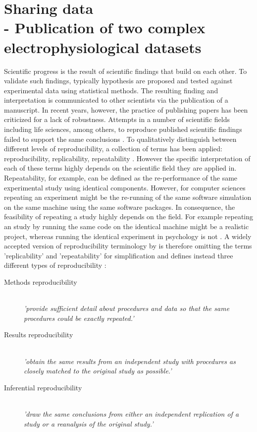 \clearpage
\chapter[Sharing data]{Sharing data\\- Publication of two complex electrophysiological datasets}
\label{sec:data}

Scientific progress is the result of scientific findings that build on each other. To validate such findings, typically hypothesis are proposed and tested against experimental data using statistical methods. The resulting finding and interpretation is communicated to other scientists via the publication of a manuscript. In recent years, however, the practice of publishing papers has been criticized for a lack of robustness. Attempts in a number of scientific fields including life sciences, among others, to reproduce published scientific findings failed to support the same conclusions \citep{Baker_2016, Fidler_2017, Pashler_2012, Ioannidis_2005, Goodman_2007, Ioannidis_2007, OpenScienceCollaboration_2015}. To qualitatively distinguish between different levels of reproducibility, a collection of terms has been applied: reproducibility, replicability, repeatability \citep{Plesser_2018, Drummond_2009}. However the specific interpretation of each of these terms highly depends on the scientific field they are applied in. Repeatability, for example, can be defined as the re-performance of the same experimental study using identical components. However, for computer sciences repeating an experiment might be the re-running of the same software simulation on the same machine using the same software packages. In consequence, the feasibility of repeating a study highly depends on the field. For example repeating an study by running the same code on the identical machine might be a realistic project, whereas running the identical experiment in psychology is not \citep{Anderson_2016}. A widely accepted version of reproducibility terminology by \citet{Goodman_2007} is therefore omitting the terms 'replicability' and 'repeatability' for simplification and defines instead three different types of reproducibility \citep[from][]{Plesser_2018}:

\begin{minipage}{\textwidth}
\begin{description}
 \item[Methods reproducibility] \hfill \\ \textit{'provide sufficient detail about procedures and data so that the same procedures could be exactly repeated.'}
\item[Results reproducibility] \hfill \\ \textit{'obtain the same results from an independent study with procedures as closely matched to the original study as possible.'}
\item[Inferential reproducibility] \hfill \\ \textit{'draw the same conclusions from either an independent replication of a study or a reanalysis of the original study.'}\\
\end{description}
\end{minipage}

